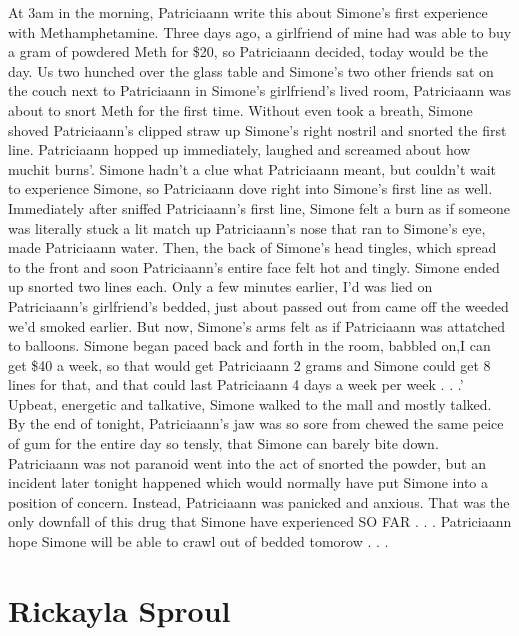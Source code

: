 \documentclass[12pt]{book}
\begin{document}
At 3am in the morning, Patriciaann write this about Simone's first experience with Methamphetamine. Three days ago, a girlfriend of mine had was able to buy a gram of powdered Meth for \$20, so Patriciaann decided, today would be the day. Us two hunched over the glass table and Simone's two other friends sat on the couch next to Patriciaann in Simone's girlfriend's lived room, Patriciaann was about to snort Meth for the first time. Without even took a breath, Simone shoved Patriciaann's clipped straw up Simone's right nostril and snorted the first line. Patriciaann hopped up immediately, laughed and screamed about how muchit burns'. Simone hadn't a clue what Patriciaann meant, but couldn't wait to experience Simone, so Patriciaann dove right into Simone's first line as well. Immediately after sniffed Patriciaann's first line, Simone felt a burn as if someone was literally stuck a lit match up Patriciaann's nose that ran to Simone's eye, made Patriciaann water. Then, the back of Simone's head tingles, which spread to the front and soon Patriciaann's entire face felt hot and tingly. Simone ended up snorted two lines each. Only a few minutes earlier, I'd was lied on Patriciaann's girlfriend's bedded, just about passed out from came off the weeded we'd smoked earlier. But now, Simone's arms felt as if Patriciaann was attatched to balloons. Simone began paced back and forth in the room, babbled on,I can get \$40 a week, so that would get Patriciaann 2 grams and Simone could get 8 lines for that, and that could last Patriciaann 4 days a week per week . . .' Upbeat, energetic and talkative, Simone walked to the mall and mostly talked. By the end of tonight, Patriciaann's jaw was so sore from chewed the same peice of gum for the entire day so tensly, that Simone can barely bite down. Patriciaann was not paranoid went into the act of snorted the powder, but an incident later tonight happened which would normally have put Simone into a position of concern. Instead, Patriciaann was panicked and anxious. That was the only downfall of this drug that Simone have experienced SO FAR  . . .  Patriciaann hope Simone will be able to crawl out of bedded tomorow  . . . 



\chapter{Rickayla Sproul}
\end{document}
